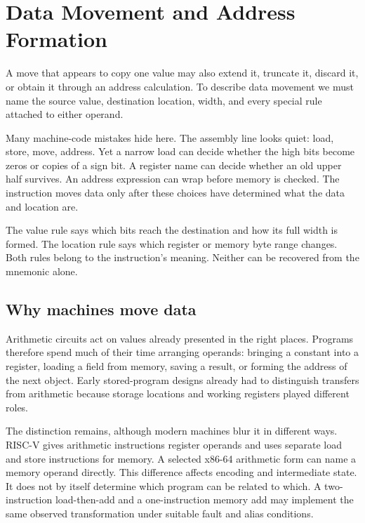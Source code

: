 \chapter{Data Movement and Address Formation}
\label{ch:data-addresses}

A move that appears to copy one value may also extend it, truncate it, discard
it, or obtain it through an address calculation. To describe data movement we
must name the source value, destination location, width, and every special rule
attached to either operand.

Many machine-code mistakes hide here. The assembly line looks quiet:
load, store, move, address. Yet a narrow load can decide whether the high bits
become zeros or copies of a sign bit. A register name can decide whether an old
upper half survives. An address expression can wrap before memory is checked.
The instruction moves data only after these choices have determined what the
data and location are.

\begin{keyidea}[title={A movement has a value rule and a location rule}]
The value rule says which bits reach the destination and how its full width is
formed. The location rule says which register or memory byte range changes.
Both rules belong to the instruction's meaning. Neither can be recovered from
the mnemonic alone.
\end{keyidea}

\section{Why machines move data}

Arithmetic circuits act on values already presented in the right places.
Programs therefore spend much of their time arranging operands: bringing a
constant into a register, loading a field from memory, saving a result, or
forming the address of the next object. Early stored-program designs already
had to distinguish transfers from arithmetic because storage locations and
working registers played different roles.

The distinction remains, although modern machines blur it in different ways.
RISC-V gives arithmetic instructions register operands and uses separate load
and store instructions for memory. A selected x86-64 arithmetic form can name
a memory operand directly. This difference affects encoding and intermediate
state. It does not by itself determine which program can be related to which.
A two-instruction load-then-add and a one-instruction memory add may implement
the same observed transformation under suitable fault and alias conditions.

